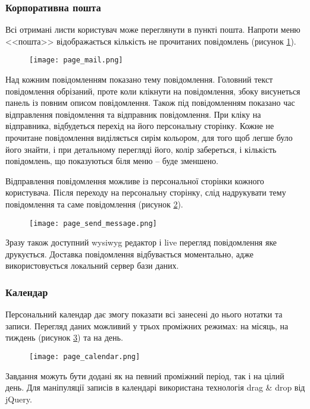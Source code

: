 \subsubsection{Корпоративна пошта}
\par Всі отримані листи користувач може переглянути в пункті пошта. Напроти меню <<пошта>> відображається кількість не прочитаних повідомлень (рисунок \ref{pic:page_mail}).
  \begin{figure}[!ht]
  \centering
      \texttt{[image: page\_mail.png]}
      \label{pic:page_mail}
  \end{figure}
\par Над кожним повідомленням показано тему повідомлення. Головний текст повідомлення обрізаний, проте коли клікнути на повідомлення, збоку висунеться панель із повним описом повідомлення. Також під повідомленням показано час відправлення повідомлення та відправник повідомлення. При кліку на відправника, відбудеться перехід на його персональну сторінку. Кожне не прочитане повідомлення виділяється сирім кольором, для того щоб легше було його знайти, і при детальному перегляді його, колір забереться, і кількість повідомлень, що показуються біля меню -- буде зменшено.
\par Відправлення повідомлення можливе із персональної сторінки кожного користувача. Після переходу на персональну сторінку, слід надрукувати тему повідомлення та саме повідомлення (рисунок \ref{pic:page_send_message}).
  \begin{figure}[!ht]
  \centering
      \texttt{[image: page\_send\_message.png]}
      \label{pic:page_send_message}
  \end{figure}
\par Зразу також доступний wysiwyg редактор і live перегляд повідомлення яке друкується. Доставка повідомлення відбувається моментально, адже використовується локальний сервер бази даних.

\subsubsection{Календар}
Персональний календар дає змогу показати всі занесені до нього нотатки та записи. Перегляд даних можливий у трьох проміжних режимах: на місяць, на тиждень (рисунок \ref{pic:page_calendar}) та на день.
  \begin{figure}[!ht]
  \centering
      \texttt{[image: page\_calendar.png]}
      \label{pic:page_calendar}
  \end{figure}
\par Завдання можуть бути додані як на певний проміжний період, так і на цілий день. Для маніпуляції записів в календарі використана технологія drag \& drop від jQuery.

